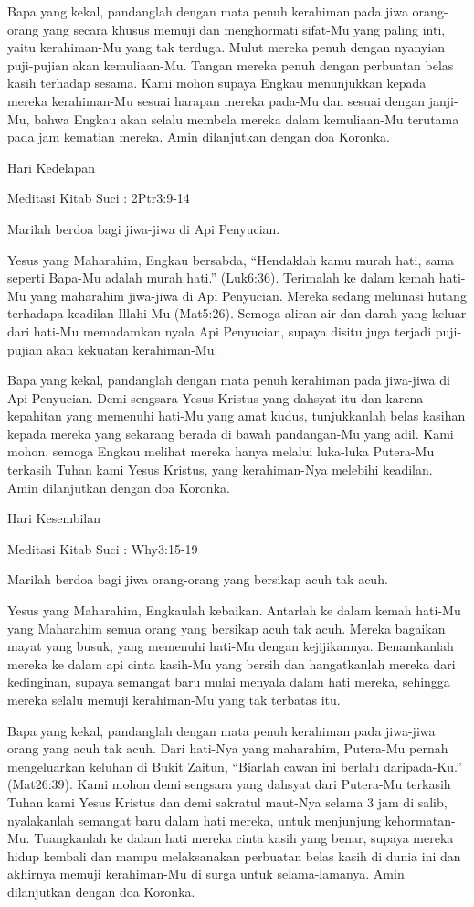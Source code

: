 \documentclass[a5paper,headsepline,titlepage,11pt,nnormalheadings,DIVcalc]{scrbook}
\begin{document}
Bapa yang kekal, pandanglah dengan mata penuh kerahiman pada jiwa orang-orang yang secara khusus memuji dan menghormati sifat-Mu yang paling inti, yaitu kerahiman-Mu yang tak terduga. Mulut mereka penuh dengan nyanyian puji-pujian akan kemuliaan-Mu. Tangan mereka penuh dengan perbuatan belas kasih terhadap sesama. Kami mohon supaya Engkau menunjukkan kepada mereka kerahiman-Mu sesuai harapan mereka pada-Mu dan sesuai dengan janji-Mu, bahwa Engkau akan selalu membela mereka dalam kemuliaan-Mu terutama pada jam kematian mereka. Amin
dilanjutkan dengan doa Koronka.

Hari Kedelapan

Meditasi Kitab Suci : 2Ptr3:9-14

Marilah berdoa bagi jiwa-jiwa di Api Penyucian.

Yesus yang Maharahim, Engkau bersabda, “Hendaklah kamu murah hati, sama seperti Bapa-Mu adalah murah hati.” (Luk6:36). Terimalah ke dalam kemah hati-Mu yang maharahim jiwa-jiwa di Api Penyucian. Mereka sedang melunasi hutang terhadapa keadilan Illahi-Mu (Mat5:26). Semoga aliran air dan darah yang keluar dari hati-Mu memadamkan nyala Api Penyucian, supaya disitu juga terjadi puji-pujian akan kekuatan kerahiman-Mu.

Bapa yang kekal, pandanglah dengan mata penuh kerahiman pada jiwa-jiwa di Api Penyucian. Demi sengsara Yesus Kristus yang dahsyat itu dan karena kepahitan yang memenuhi hati-Mu yang amat kudus, tunjukkanlah belas kasihan kepada mereka yang sekarang berada di bawah pandangan-Mu yang adil. Kami mohon, semoga Engkau melihat mereka hanya melalui luka-luka Putera-Mu terkasih Tuhan kami Yesus Kristus, yang kerahiman-Nya melebihi keadilan. Amin
dilanjutkan dengan doa Koronka.

Hari Kesembilan

Meditasi Kitab Suci : Why3:15-19

Marilah berdoa bagi jiwa orang-orang yang bersikap acuh tak acuh.

Yesus yang Maharahim, Engkaulah kebaikan. Antarlah ke dalam kemah hati-Mu yang Maharahim semua orang yang bersikap acuh tak acuh. Mereka bagaikan mayat yang busuk, yang memenuhi hati-Mu dengan kejijikannya. Benamkanlah mereka ke dalam api cinta kasih-Mu yang bersih dan hangatkanlah mereka dari kedinginan, supaya semangat baru mulai menyala dalam hati mereka, sehingga mereka selalu memuji kerahiman-Mu yang tak terbatas itu.

Bapa yang kekal, pandanglah dengan mata penuh kerahiman pada jiwa-jiwa orang yang acuh tak acuh. Dari hati-Nya yang maharahim, Putera-Mu pernah mengeluarkan keluhan di Bukit Zaitun, “Biarlah cawan ini berlalu daripada-Ku.” (Mat26:39). Kami mohon demi sengsara yang dahsyat dari Putera-Mu terkasih Tuhan kami Yesus Kristus dan demi sakratul maut-Nya selama 3 jam di salib, nyalakanlah semangat baru dalam hati mereka, untuk menjunjung kehormatan-Mu. Tuangkanlah ke dalam hati mereka cinta kasih yang benar, supaya mereka hidup kembali dan mampu melaksanakan perbuatan belas kasih di dunia ini dan akhirnya memuji kerahiman-Mu di surga untuk selama-lamanya. Amin
dilanjutkan dengan doa Koronka.
\end{document}
